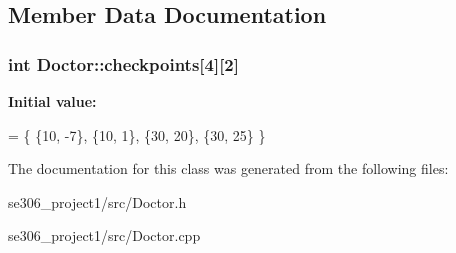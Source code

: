\subsection{Member Data Documentation}
\hypertarget{classDoctor_a9bb025d7f8f843371b1c63414272afe1}{
\subsubsection[{checkpoints}]{\setlength{\rightskip}{0pt plus 5cm}int Doctor\-::checkpoints\mbox{[}4\mbox{]}\mbox{[}2\mbox{]}\hspace{0.3cm}{\ttfamily [protected]}}}\label{classDoctor_a9bb025d7f8f843371b1c63414272afe1}
{\bfseries Initial value\-:}
\begin{DoxyCode}
= \{
            \{10, -7\},
            \{10, 1\},
            \{30, 20\},
            \{30, 25\}
            \}
\end{DoxyCode}


The documentation for this class was generated from the following files\-:\begin{DoxyCompactItemize}
\item 
se306\-\_\-project1/src/Doctor.\-h\item 
se306\-\_\-project1/src/Doctor.\-cpp\end{DoxyCompactItemize}

